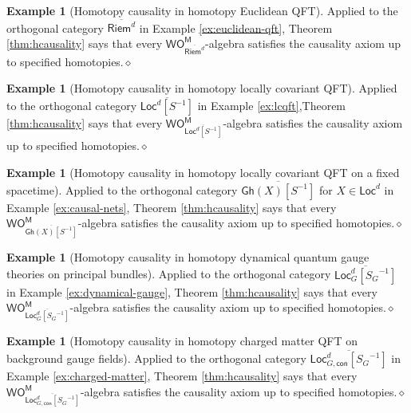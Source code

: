 \documentclass[11pt]{amsbook}
\numberwithin{section}{chapter}
\numberwithin{subsection}{section}
\numberwithin{equation}{section}
\theoremstyle{plain}
\theoremstyle{definition}
\newtheorem{example}[equation]{Example}
\newcommand{\M}{\mathsf{M}}
\renewcommand{\O}{\mathsf{O}}
\newcommand{\Otom}{\O^{\M}}
\newcommand{\W}{\mathsf{W}}
\newcommand{\dqed}{\hfill$\diamond$}
\newcommand{\inv}[1]{{#1}^{-1}}
\newcommand{\Sinv}{\inv{S}}
\newcommand{\Bgloc}{\Locd_G}
\newcommand{\Bglocsginv}{\Bgloc[\inv{S_G}]}
\newcommand{\Bglocsginvbar}{\overline{\Bglocsginv}}
\newcommand{\Bgconloc}{\Locd_{G,\mathsf{con}}}
\newcommand{\Bgconlocsginv}{\Bgconloc[\inv{S_G}]}
\newcommand{\Bgconlocsginvbar}{\overline{\Bgconlocsginv}}
\newcommand{\Gh}{\mathsf{Gh}}
\newcommand{\Ghx}{\Gh(X)}
\newcommand{\Ghxsinvbar}{\overline{\Ghx[\Sinv]}}
\newcommand{\Loc}{\mathsf{Loc}}
\newcommand{\Locd}{\Loc^d}
\newcommand{\Locdsinv}{\Locd[\Sinv]}
\newcommand{\Locdsinvbar}{\overline{\Locdsinv}}
\newcommand{\Riem}{\mathsf{Riem}}
\newcommand{\Riemd}{\Riem^d}
\newcommand{\Riemdbar}{\overline{\Riemd}}
\newcommand{\wom}{\W\Otom}
\begin{document}
\begin{example}[Homotopy causality in homotopy Euclidean QFT]\label{ex:hcausality-euclidean}
Applied to the orthogonal category $\Riemdbar$ in Example \ref{ex:euclidean-qft}, Theorem \ref{thm:hcausality} says that every $\wom_{\Riemdbar}$-algebra satisfies the causality axiom up to specified homotopies.\dqed\end{example}

\begin{example}[Homotopy causality in homotopy locally covariant QFT]\label{ex:hcausality-lcqft}
Applied to the orthogonal category $\Locdsinvbar$ in Example \ref{ex:lcqft},Theorem \ref{thm:hcausality} says that every $\wom_{\Locdsinvbar}$-algebra satisfies the causality axiom up to specified homotopies.\dqed\end{example}

\begin{example}[Homotopy causality in homotopy locally covariant QFT on a fixed spacetime]\label{ex:hcausality-lcqft-fixed}
Applied to the orthogonal category $\Ghxsinvbar$ for $X \in \Locd$ in Example \ref{ex:causal-nets}, Theorem \ref{thm:hcausality} says that every $\wom_{\Ghxsinvbar}$-algebra satisfies the causality axiom up to specified homotopies.\dqed\end{example}

\begin{example}[Homotopy causality in homotopy dynamical quantum gauge theories on principal bundles]\label{ex:hcausality-dynamical}
Applied to the orthogonal category $\Bglocsginvbar$ in Example \ref{ex:dynamical-gauge}, Theorem \ref{thm:hcausality} says that every $\wom_{\Bglocsginvbar}$-algebra satisfies the causality axiom up to specified homotopies.\dqed\end{example}

\begin{example}[Homotopy causality in homotopy charged matter QFT on background gauge fields]\label{ex:hcausality-charged}
Applied to the orthogonal category $\Bgconlocsginvbar$ in Example \ref{ex:charged-matter}, Theorem \ref{thm:hcausality} says that every $\wom_{\Bgconlocsginvbar}$-algebra satisfies the causality axiom up to specified homotopies.\dqed\end{example}
\end{document}

